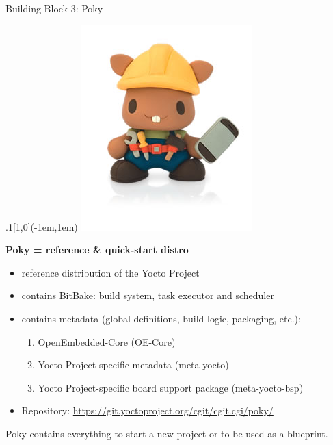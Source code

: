 \documentclass[ucs,9pt]{beamer}
\begin{document}
\begin{frame}
    {Building Block 3: Poky}

    \begin{textblock*}{.1\paperwidth}[1,0](\paperwidth-1em,1em)%
        \includegraphics[width=\linewidth]{images/poky-beaver}
    \end{textblock*}%

    \textbf{Poky = reference \& quick-start distro}
    \begin{itemize}
        \item reference distribution of the Yocto Project
        \item contains BitBake: build system, task executor and scheduler
        \item contains metadata (global definitions, build logic, packaging, etc.):
        \begin{enumerate}
            \item OpenEmbedded-Core (OE-Core)
            \item Yocto Project-specific metadata (meta-yocto)
            \item Yocto Project-specific board support package (meta-yocto-bsp)
        \end{enumerate}
        \item Repository: \url{https://git.yoctoproject.org/cgit/cgit.cgi/poky/}
    \end{itemize}
    \bigskip

    Poky contains everything to start a new project or to be used as a blueprint.
\end{frame}
\end{document}
